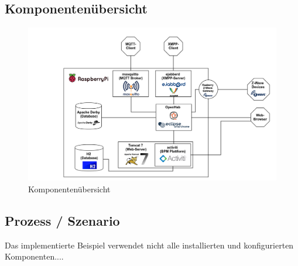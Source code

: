 \newpage
\begin{landscape}
\subsection{Komponentenübersicht}
\begin{figure}[H]
  \centering
  \includegraphics[width=21cm]{./images/Component-Overview}
  \caption{Komponentenübersicht}
\end{figure}
\end{landscape}


\subsection{Prozess / Szenario}
Das implementierte Beispiel verwendet nicht alle installierten und konfigurierten Komponenten....
